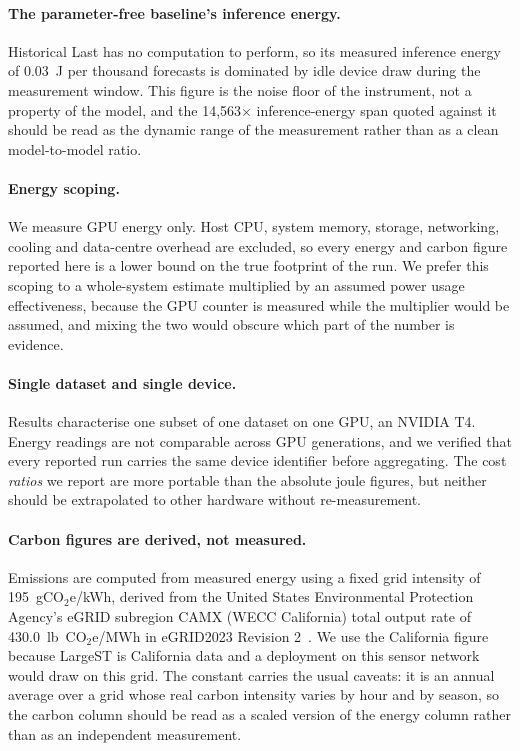\documentclass[manuscript,screen,review]{acmart}
\begin{document}
\paragraph{The parameter-free baseline's inference energy.} Historical Last
has no computation to perform, so its measured inference energy of 0.03~J per
thousand forecasts is dominated by idle device draw during the measurement
window. This figure is the noise floor of the instrument, not a property of
the model, and the 14,563$\times$ inference-energy span quoted against it
should be read as the dynamic range of the measurement rather than as a clean
model-to-model ratio.

\paragraph{Energy scoping.} We measure GPU energy only. Host CPU, system
memory, storage, networking, cooling and data-centre overhead are excluded, so
every energy and carbon figure reported here is a lower bound on the true
footprint of the run. We prefer this scoping to a whole-system estimate
multiplied by an assumed power usage effectiveness, because the GPU counter is
measured while the multiplier would be assumed, and mixing the two would
obscure which part of the number is evidence.

\paragraph{Single dataset and single device.} Results characterise one subset
of one dataset on one GPU, an NVIDIA T4. Energy readings are not comparable
across GPU generations, and we verified that every reported run carries the
same device identifier before aggregating. The cost \emph{ratios} we report
are more portable than the absolute joule figures, but neither should be
extrapolated to other hardware without re-measurement.

\paragraph{Carbon figures are derived, not measured.} Emissions are computed
from measured energy using a fixed grid intensity of 195~gCO$_2$e/kWh, derived
from the United States Environmental Protection Agency's eGRID subregion CAMX
(WECC California) total output rate of 430.0~lb~CO$_2$e/MWh in eGRID2023
Revision 2~\cite{epa2025egrid}. We use the California figure because LargeST
is California data and a deployment on this sensor network would draw on this
grid. The constant carries the usual caveats: it is an annual average over a
grid whose real carbon intensity varies by hour and by season, so the carbon
column should be read as a scaled version of the energy column rather than as
an independent measurement.
\end{document}
